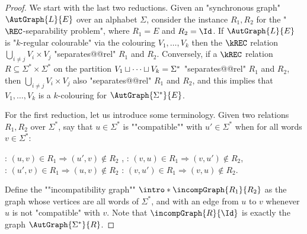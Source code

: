 \begin{proof}
   We start with the last two reductions.
    Given an "synchronous graph" $\AutGraph{L}{E}$ over an alphabet $\Sigma$, consider the instance $R_1,R_2$ for the "$\REC$-separability problem", where 
    $R_1 = E$ and $R_2 = \Id$. 
    If $\AutGraph{L}{E}$ is "$k$-regular colourable" via the colouring $V_1, \dotsc, V_k$ then the $\kREC$ relation
    $\bigcup_{i \neq j} V_i \times V_j$ "separates@@rel" $R_1$ and $R_2$.
    Conversely, if a $\kREC$ relation $R \subseteq \Sigma^* \times \Sigma^*$ on the partition $V_1 \sqcup \dotsb \sqcup V_k = \Sigma^*$ "separates@@rel" $R_1$ and $R_2$, then $\bigcup_{i \neq j} V_i \times V_j$ also "separates@@rel" $R_1$ and $R_2$, and this implies that $V_1, \dotsc, V_k$ is a $k$-colouring for $\AutGraph{\Sigma^*}{E}$.

\AP For the first reduction, let us introduce some terminology.
Given two relations $R_1,R_2$ over $\Sigma^*$, say that $u \in \Sigma^*$ is ""compatible"" with
$u' \in \Sigma^*$ when for all words $v \in \Sigma^*$:
\begin{center}
    \intro*\compL: $(u,v) \in R_1 \Rightarrow (u',v) \not\in R_2$%
    ,\hphantom{\text{ \fancyand }}
    \intro*\compR: $(v,u) \in R_1 \Rightarrow (v,u') \not\in R_2$,\\
    \intro*\compLpr: $(u',v) \in R_1 \Rightarrow (u,v) \not\in R_2$%
    \hphantom{,}\text{ \fancyand }
    \intro*\compRpr: $(v,u') \in R_1 \Rightarrow (v,u) \not\in R_2$.
\end{center}
\AP
Define the ""incompatibility graph"" $\intro*\incompGraph{R_1}{R_2}$
as the graph whose vertices are all words of $\Sigma^*$,
and with an edge from $u$ to $v$ whenever $u$ is not "compatible" with $v$.
Note that $\incompGraph{R}{\Id}$ is exactly the graph $\AutGraph{\Sigma^*}{R}$.


\end{proof}
